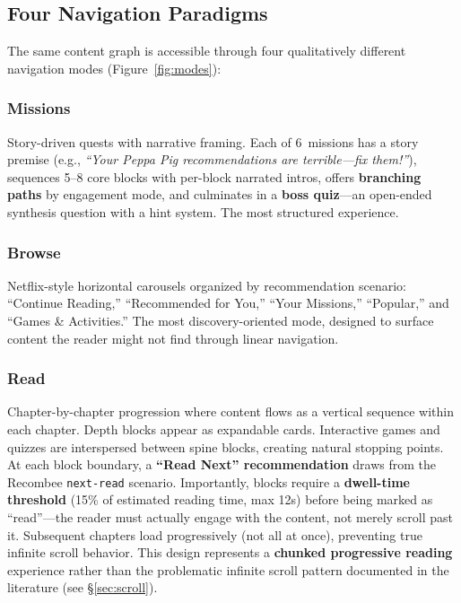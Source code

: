 \documentclass[11pt,a4paper]{article}
\begin{document}
\subsection{Four Navigation Paradigms}\label{sec:nav}

The same content graph is accessible through four qualitatively different navigation modes (Figure~\ref{fig:modes}):

\subsubsection{Missions} Story-driven quests with narrative framing. Each of 6~missions has a story premise (e.g., \emph{``Your Peppa Pig recommendations are terrible---fix them!''}), sequences 5--8 core blocks with per-block narrated intros, offers \textbf{branching paths} by engagement mode, and culminates in a \textbf{boss quiz}---an open-ended synthesis question with a hint system. The most structured experience.

\subsubsection{Browse} Netflix-style horizontal carousels organized by recommendation scenario: ``Continue Reading,'' ``Recommended for You,'' ``Your Missions,'' ``Popular,'' and ``Games \& Activities.'' The most discovery-oriented mode, designed to surface content the reader might not find through linear navigation.

\subsubsection{Read} Chapter-by-chapter progression where content flows as a vertical sequence within each chapter. Depth blocks appear as expandable cards. Interactive games and quizzes are interspersed between spine blocks, creating natural stopping points. At each block boundary, a \textbf{``Read Next'' recommendation} draws from the Recombee \texttt{next-read} scenario. Importantly, blocks require a \textbf{dwell-time threshold} (15\% of estimated reading time, max 12s) before being marked as ``read''---the reader must actually engage with the content, not merely scroll past it. Subsequent chapters load progressively (not all at once), preventing true infinite scroll behavior. This design represents a \textbf{chunked progressive reading} experience rather than the problematic infinite scroll pattern documented in the literature (see \S\ref{sec:scroll}).
\end{document}
